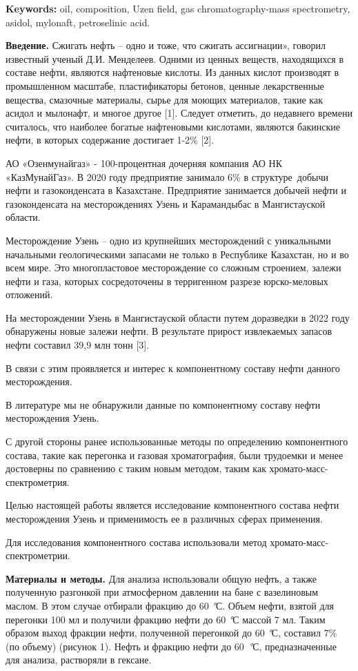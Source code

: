 {\bfseries Keywords:} oil, composition, Uzen field, gas
chromatography-mass spectrometry, asidol, mylonaft, petroselinic acid.

\begin{multicols}{2}
{\bfseries Введение.} Сжигать нефть -- одно и тоже, что сжигать
ассигнации», говорил известный ученый Д.И. Менделеев. Одними из ценных
веществ, находящихся в составе нефти, являются нафтеновые кислоты. Из
данных кислот производят в промышленном масштабе, пластификаторы
бетонов, ценные лекарственные вещества, смазочные материалы, сырье для
моющих материалов, такие как асидол и мылонафт, и многое другое {[}1{]}.
Следует отметить, до недавнего времени считалось, что наиболее богатые
нафтеновыми кислотами, являются бакинские нефти, в которых содержание
достигает 1-2\% {[}2{]}.

АО «Озенмунайгаз» - 100-процентная дочерняя компания АО НК
«КазМунайГаз». В 2020 году предприятие занимало 6\% в структуре~добычи
нефти и газоконденсата в Казахстане. Предприятие занимается добычей
нефти и газоконденсата на месторождениях Узень и Карамандыбас в
Мангистауской области.

Месторождение Узень -- одно из крупнейших месторождений с уникальными
начальными геологическими запасами не только в Республике Казахстан, но
и во всем мире. Это многопластовое месторождение со сложным строением,
залежи нефти и газа, которых сосредоточены в терригенном разрезе
юрско-меловых отложений.

На месторождении Узень в Мангистауской области путем доразведки в 2022
году обнаружены новые залежи нефти. В результате прирост извлекаемых
запасов нефти составил 39,9 млн тонн {[}3{]}.

В связи с этим проявляется и интерес к компонентному составу нефти
данного месторождения.

В литературе мы не обнаружили данные по компонентному составу нефти
месторождения Узень.

С другой стороны ранее использованные методы по определению
компонентного состава, такие как перегонка и газовая хроматография, были
трудоемки и менее достоверны по сравнению с таким новым методом, таким
как хромато-масс-спектрометрия.

Целью настоящей работы является исследование компонентного состава нефти
месторождения Узень и применимость ее в различных сферах применения.

Для исследования компонентного состава использовали метод
хромато-масс-спектрометрии.

{\bfseries Материалы и методы.} Для анализа использовали общую нефть, а
также полученную разгонкой при атмосферном давлении на бане с
вазелиновым маслом. В этом случае отбирали фракцию до 60 \emph{°}С.
Объем нефти, взятой для перегонки 100 мл и получили фракцию нефти до 60
\emph{°}С массой 7 мл. Таким образом выход фракции нефти, полученной
перегонкой до 60 \emph{°}С, составил 7\% (по объему) (рисунок 1). Нефть
и фракцию нефти до 60~\emph{°}С, предназначенные для анализа, растворяли
в гексане.


\end{multicols}
